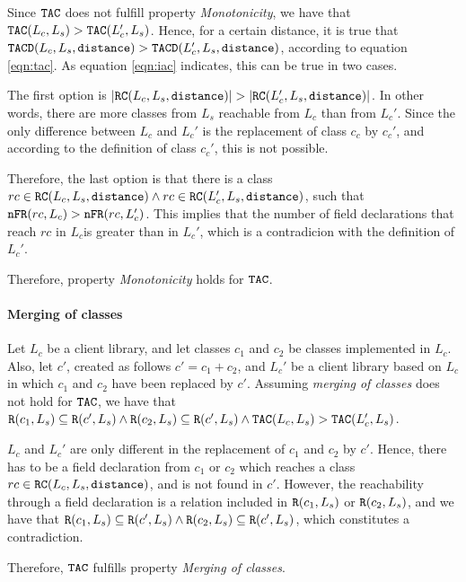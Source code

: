 Since $\verb|TAC|$ does not fulfill property \textit{Monotonicity}, we have that $\verb|TAC|(L_c, L_s) > \verb|TAC|(L_c', L_s)$. Hence, for a certain distance, it is true that $\verb|TACD|(L_c,L_s,\verb|distance|) > \verb|TACD|(L_c',L_s,\verb|distance|)$, according to equation \ref{eqn:tac}. As equation \ref{eqn:iac} indicates, this can be true in two cases.

The first option is $|\verb|RC|(L_c,L_s,\verb|distance|)| > |\verb|RC|(L_c',L_s,\verb|distance|)|$.
In other words, there are more classes from $L_s$ reachable from $L_c$ than from $L_c'$. Since the only difference between $L_c$ and $L_c'$ is the replacement of class $c_c$ by $c_c'$, and according to the definition of class $c_c'$, this is not possible.

Therefore, the last option is that there is a class $rc \in \verb|RC|(L_c,L_s,\verb|distance|) \land rc \in \verb|RC|(L_c',L_s,\verb|distance|)$, such that   $\verb|nFR|(rc,L_c) > \verb|nFR|(rc,L_c')$. This implies that the number of field declarations that reach $rc$ in $L_c$is greater than in $L_c'$, which is a contradicion with the definition of $L_c'$.

Therefore, property \textit{Monotonicity} holds for $\verb|TAC|$.

\paragraph{Merging of classes}
Let $L_c$ be a client library, and let classes $c_1$ and $c_2$ be classes implemented in $L_c$. Also, let $c'$, created as follows $c' = c_1 + c_2$, and $L_c'$ be a client library based on $L_c$ in which $c_1$ and $c_2$ have been replaced by $c'$. Assuming \textit{merging of classes} does not hold for $\verb|TAC|$, we have that $\verb|R|(c_1, L_s) \subseteq \verb|R|(c', L_s) \land \verb|R|(c_2, L_s) \subseteq \verb|R|(c', L_s) \land \verb|TAC|(L_c, L_s) > \verb|TAC|(L_c', L_s)$.

$L_c$ and $L_c'$ are only different in the replacement of $c_1$ and $c_2$ by $c'$. Hence, there has to be a field declaration from $c_1$ or $c_2$ which reaches a class $rc \in \verb|RC|(L_c,L_s,\verb|distance|)$, and is not found in $c'$. However, the reachability through a field declaration is a relation included in $\verb|R|(c_1, L_s)$ or $\verb|R|(c_2, L_s)$, and we have that $\verb|R|(c_1, L_s) \subseteq \verb|R|(c', L_s) \land \verb|R|(c_2, L_s) \subseteq \verb|R|(c', L_s)$, which constitutes a contradiction.

Therefore, $\verb|TAC|$ fulfills property \textit{Merging of classes}.

